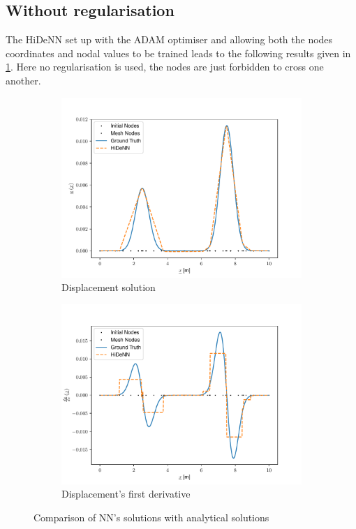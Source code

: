 \subsection{Without regularisation}
The HiDeNN set up with the ADAM optimiser and allowing both the nodes coordinates and nodal values to be trained leads to the following results given in \cref{fig:FirstSol}. Here no regularisation is used, the nodes are just forbidden to cross one another.
\begin{figure}
    \begin{subfigure}{0.5\linewidth}
        \centering
        \includegraphics[width=\linewidth]{Figures/Solution_displacement.pdf}
        \caption{Displacement solution}
    \end{subfigure}
    \begin{subfigure}{0.5\linewidth}
        \centering
        \includegraphics[width=\linewidth]{Figures/Solution_gradients.pdf}
        \caption{Displacement's first derivative}
    \end{subfigure}
    \caption{Comparison of NN's solutions with analytical solutions}
    \label{fig:FirstSol}
\end{figure}
